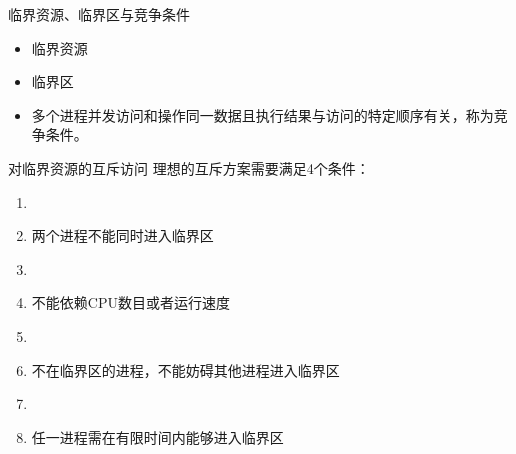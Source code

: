 \documentclass[xcolor=svgnames]{beamer}
\begin{document}
\begin{CJK*}{UTF8}{gbsn}
\begin{frame}{临界资源、临界区与竞争条件}
\begin{itemize}
\item 临界资源
\item 临界区
\item 多个进程并发访问和操作同一数据且执行结果与访问的特定顺序有关，称为竞争条件。
\end{itemize}
\end{frame}

\begin{frame}{对临界资源的互斥访问}
理想的互斥方案需要满足4个条件：
\begin{enumerate}
\item[]
\item 两个进程不能同时进入临界区
\item[]
\item 不能依赖CPU数目或者运行速度
\item[]
\item 不在临界区的进程，不能妨碍其他进程进入临界区
\item[]
\item 任一进程需在有限时间内能够进入临界区
\end{enumerate}
\end{frame}


\end{CJK*}
\end{document}
